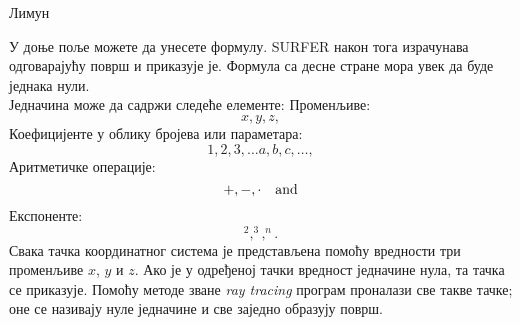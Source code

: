 \documentclass[sr]{./../../common/SurferDesc}%
\begin{document}
\footnotesize
%
\begin{surferPage}
  \begin{surferTitle}Лимун
  \end{surferTitle}   %

У доње поље можете да унесете формулу. SURFER  након тога израчунава одговарајућу површ и приказује је. Формула са десне стране мора увек да буде једнака нули.
\\
Једначина може да садржи следеће елементе:
\newline
Променљиве:
\[x, y, z, \]
Коефицијенте у облику бројева или параметара:
\[1, 2, 3, \dots a, b, c, \dots, \]
Аритметичке операције:
\[+,  - , \cdot \quad \textnormal{and} \]
Експоненте:
\[ ^2, ^3, ^n .\]
Свака тачка координатног система је представљена помоћу вредности три променљиве $x$, $y$ и $z$. Ако је у одређеној тачки вредност једначине нула, та тачка се приказује. Помоћу методе зване \textit{ray tracing} програм проналази све такве тачке; оне се називају нуле једначине и све заједно образују површ.

  
  \begin{surferText}
     \end{surferText}
\end{surferPage}


\end{document}
